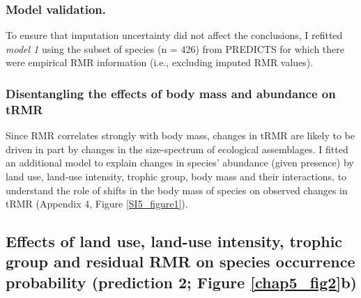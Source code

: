 
\subsubsection*{Model validation.}
To ensure that imputation uncertainty did not affect the conclusions, I refitted \textit{model 1} using the subset of species (n = 426) from PREDICTS for which there were empirical RMR information (i.e., excluding imputed RMR values). 

\subsubsection*{Disentangling the effects of body mass and abundance on tRMR}
Since RMR correlates strongly with body mass, changes in tRMR are likely to be driven in part by changes in the size-spectrum of ecological assemblages. I fitted an additional model to explain changes in species' abundance (given presence) by land use, land-use intensity, trophic group, body mass and their interactions, to understand the role of shifts in the body mass of species on observed changes in tRMR (Appendix 4, Figure \ref{SI5_figure1}).  

\subsection{Effects of land use, land-use intensity, trophic group and residual RMR on species occurrence probability (prediction 2; Figure \ref{chap5_fig2}b)}

